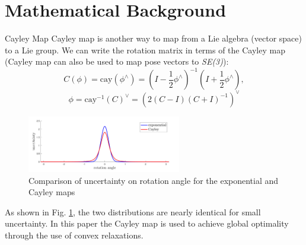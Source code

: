 \documentclass[8pt]{beamer}
\begin{document}
\section{Mathematical Background}
\begin{frame}{Cayley Map}
Cayley map is another way to map from a Lie algebra (vector space) to a Lie group. We can write the rotation matrix in terms of the Cayley map (Cayley map can also be used to map pose vectors to \textit{SE(3)}):
\begin{equation}
C(\phi) = \text{cay}(\phi^\wedge) = \left( I - \frac{1}{2} \phi^\wedge \right)^{-1} \left( I + \frac{1}{2} \phi^\wedge \right),
\end{equation}
\begin{equation}
\phi = \text{cay}^{-1}(C)^\vee = (2(C - I)(C + I)^{-1})^\vee
\end{equation}

\begin{figure}
    \centering
    \includegraphics[width=0.6\textwidth]{figures/cayley_vs_exp.png}
    \caption{Comparison of uncertainty on rotation angle for the exponential and Cayley maps}
    \label{fig:caylet_vs_exp}
\end{figure}

As shown in Fig. \ref{fig:caylet_vs_exp}, the two distributions are nearly identical for small uncertainty. In this paper the Cayley map is used to achieve global optimality through the use of convex relaxations.

\end{frame}
\end{document}
